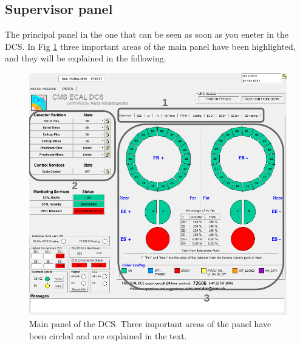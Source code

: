 \documentclass[12pt]{article}
\begin{document}
\subsection{Supervisor panel}
The principal panel in the one that can be seen as soon as you eneter in the DCS. In Fig \ref{fig:principalpanel_withnumbers} three important areas of the main panel have been highlighted, and they will be explained in the following. 

\begin{figure}[!h]
	\centering
	\includegraphics[width=1\textwidth]{Pics/principalpanel_withnumbers.png}
	\caption{Main panel of the DCS. Three important areas of the panel have been circled and are explained in the text.}
	\label{fig:principalpanel_withnumbers}
\end{figure}
\end{document}
